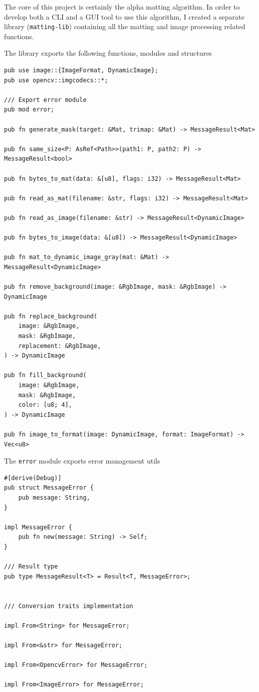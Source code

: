 \documentclass[a4paper]{article}
\begin{document}
The core of this project is certainly the alpha matting algorithm.
In order to develop both a CLI and a GUI tool to
use this algorithm, I created a separate library (\texttt{matting-lib})
containing all the matting and image processing related functions.

The library exports the following functions, modules and structures

\begin{lstlisting}[style=Rust, style=boxed]
pub use image::{ImageFormat, DynamicImage};
pub use opencv::imgcodecs::*;

/// Export error module
pub mod error;

pub fn generate_mask(target: &Mat, trimap: &Mat) -> MessageResult<Mat>

pub fn same_size<P: AsRef<Path>>(path1: P, path2: P) -> MessageResult<bool>

pub fn bytes_to_mat(data: &[u8], flags: i32) -> MessageResult<Mat>

pub fn read_as_mat(filename: &str, flags: i32) -> MessageResult<Mat>

pub fn read_as_image(filename: &str) -> MessageResult<DynamicImage>

pub fn bytes_to_image(data: &[u8]) -> MessageResult<DynamicImage>

pub fn mat_to_dynamic_image_gray(mat: &Mat) -> MessageResult<DynamicImage>

pub fn remove_background(image: &RgbImage, mask: &RgbImage) -> DynamicImage

pub fn replace_background(
    image: &RgbImage,
    mask: &RgbImage,
    replacement: &RgbImage,
) -> DynamicImage

pub fn fill_background(
    image: &RgbImage,
    mask: &RgbImage,
    color: [u8; 4],
) -> DynamicImage

pub fn image_to_format(image: DynamicImage, format: ImageFormat) -> Vec<u8>
\end{lstlisting}

The \texttt{error} module exports error management utils

\begin{lstlisting}[style=Rust, style=boxed]
#[derive(Debug)]
pub struct MessageError {
    pub message: String,
}

impl MessageError {
    pub fn new(message: String) -> Self;
}

/// Result type
pub type MessageResult<T> = Result<T, MessageError>;


/// Conversion traits implementation

impl From<String> for MessageError;

impl From<&str> for MessageError;

impl From<OpencvError> for MessageError;

impl From<ImageError> for MessageError;
\end{lstlisting}
\end{document}
